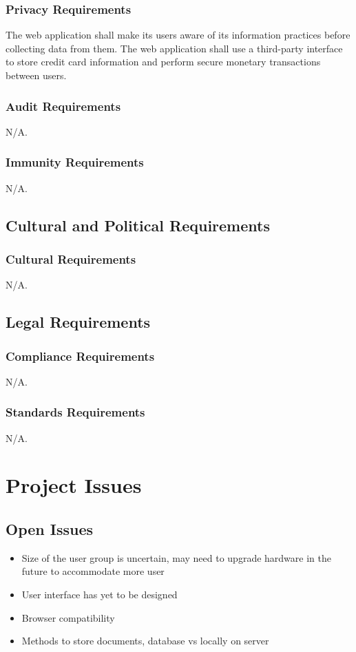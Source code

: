\documentclass[12pt, titlepage]{article}
\begin{document}
{\subsubsection{Privacy Requirements}
The web application shall make its users aware of its information practices before collecting data from them. The web application shall use a third-party interface to store credit card information and perform secure monetary transactions between users.
\subsubsection{Audit Requirements}
N/A.
\subsubsection{Immunity Requirements}
N/A.
\subsection{Cultural and Political Requirements}
\subsubsection{Cultural Requirements}
N/A.
\subsection{Legal Requirements}
\subsubsection{Compliance Requirements}
N/A.
\subsubsection{Standards Requirements}
N/A.

\section{Project Issues}
\subsection{Open Issues}
\begin{itemize}
  \item Size of the user group is uncertain, may need to upgrade hardware in the future to accommodate more user
  \item User interface has yet to be designed
  \item Browser compatibility
  \item Methods to store documents, database vs locally on server
\end{itemize}

}
\end{document}

